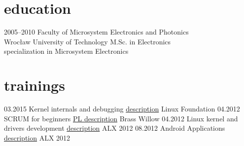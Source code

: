 \documentclass[]{friggeri-cv}
\begin{document}

\section{education}

\begin{entrylist}
  \entry
    {2005–2010}
    {Faculty of Microsystem Electronics and Photonics}
    {\\ Wrocław University of Technology}
    {M.Sc. in Electronics\\
    specialization in Microsystem Electronics}
\end{entrylist}

\pagebreak

\section{trainings}
\begin{entrylist}
	\entry
		{03.2015}
		{Kernel internals and debugging}
		{\href{http://training.linuxfoundation.org/linux-courses/development-training/linux-kernel-internals-and-debugging}{description}}
		{Linux Foundation}
	\entry
		{04.2012}
		{SCRUM for beginners}
		{\href{http://brasswillow.pl/warsztaty-i-szkolenia/wstep-do-scrum/}{PL description}}
		{Brass Willow}
	\entry
		{04.2012}
		{Linux kernel and drivers development}
		{\href{http://www.alx.pl/en/courses/linux-driver-development/}{description}}
		{ALX 2012}
	\entry
		{08.2012}
		{Android Applications}
		{\href{http://www.alx.pl/en/courses/android-101-201/}{description}}
		{ALX 2012}		
\end{entrylist}
\end{document}
